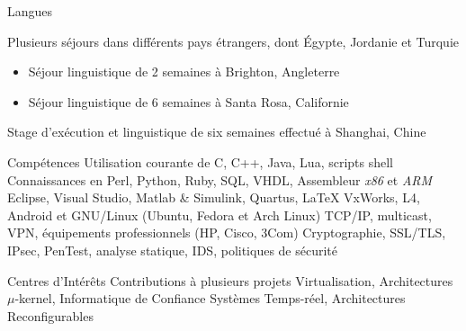 \begin{resume}
\begin{supitemize}{Langues}
		{
			Plusieurs séjours dans différents pays étrangers, dont \'Egypte, Jordanie et Turquie
			\begin{itemize}
				\item Séjour linguistique de 2 semaines à Brighton, Angleterre
				\item Séjour linguistique de 6 semaines à Santa Rosa, Californie
			\end{itemize}
		}
		{}
		{Stage d'exécution et linguistique de six semaines effectué à Shanghai, Chine}
\end{supitemize}

\begin{supitemize}{Compétences}
		{
			Utilisation courante de C, C++, Java, Lua, scripts shell\newline
			Connaissances en Perl, Python, Ruby, SQL, VHDL, Assembleur \emph{x86} et \emph{ARM}
		}
		{Eclipse, Visual Studio, Matlab \& Simulink, Quartus, \LaTeX}
		{VxWorks, L4, Android et GNU/Linux (Ubuntu, Fedora et Arch Linux)}
		{TCP/IP, multicast, VPN, équipements professionnels (HP, Cisco, 3Com)}
		{Cryptographie, SSL/TLS, IPsec, PenTest, analyse statique, IDS, politiques de sécurité}
\end{supitemize}

\begin{supitemize}{Centres d'Intérêts}
		{Contributions à plusieurs projets}
		{Virtualisation, Architectures \ensuremath{\mu}-kernel, Informatique de Confiance}
		{Systèmes Temps-réel, Architectures Reconfigurables}
\end{supitemize}

\end{resume}

